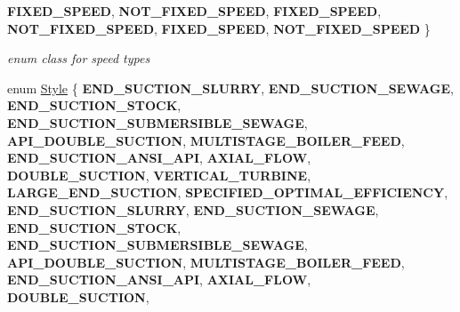 \begin{DoxyCompactItemize}
{\bfseries F\+I\+X\+E\+D\+\_\+\+S\+P\+E\+ED}, 
{\bfseries N\+O\+T\+\_\+\+F\+I\+X\+E\+D\+\_\+\+S\+P\+E\+ED}, 
{\bfseries F\+I\+X\+E\+D\+\_\+\+S\+P\+E\+ED}, 
{\bfseries N\+O\+T\+\_\+\+F\+I\+X\+E\+D\+\_\+\+S\+P\+E\+ED}, 
\newline
{\bfseries F\+I\+X\+E\+D\+\_\+\+S\+P\+E\+ED}, 
{\bfseries N\+O\+T\+\_\+\+F\+I\+X\+E\+D\+\_\+\+S\+P\+E\+ED}
 \}\begin{DoxyCompactList}\small\item\em enum class for speed types \end{DoxyCompactList}
\item 
\mbox{\label{class_pump_aef354601ce4218258cc898b35a1e90ff}} 
enum \hyperlink{class_pump_aef354601ce4218258cc898b35a1e90ff}{Style} \{ \newline
{\bfseries E\+N\+D\+\_\+\+S\+U\+C\+T\+I\+O\+N\+\_\+\+S\+L\+U\+R\+RY}, 
{\bfseries E\+N\+D\+\_\+\+S\+U\+C\+T\+I\+O\+N\+\_\+\+S\+E\+W\+A\+GE}, 
{\bfseries E\+N\+D\+\_\+\+S\+U\+C\+T\+I\+O\+N\+\_\+\+S\+T\+O\+CK}, 
{\bfseries E\+N\+D\+\_\+\+S\+U\+C\+T\+I\+O\+N\+\_\+\+S\+U\+B\+M\+E\+R\+S\+I\+B\+L\+E\+\_\+\+S\+E\+W\+A\+GE}, 
\newline
{\bfseries A\+P\+I\+\_\+\+D\+O\+U\+B\+L\+E\+\_\+\+S\+U\+C\+T\+I\+ON}, 
{\bfseries M\+U\+L\+T\+I\+S\+T\+A\+G\+E\+\_\+\+B\+O\+I\+L\+E\+R\+\_\+\+F\+E\+ED}, 
{\bfseries E\+N\+D\+\_\+\+S\+U\+C\+T\+I\+O\+N\+\_\+\+A\+N\+S\+I\+\_\+\+A\+PI}, 
{\bfseries A\+X\+I\+A\+L\+\_\+\+F\+L\+OW}, 
\newline
{\bfseries D\+O\+U\+B\+L\+E\+\_\+\+S\+U\+C\+T\+I\+ON}, 
{\bfseries V\+E\+R\+T\+I\+C\+A\+L\+\_\+\+T\+U\+R\+B\+I\+NE}, 
{\bfseries L\+A\+R\+G\+E\+\_\+\+E\+N\+D\+\_\+\+S\+U\+C\+T\+I\+ON}, 
{\bfseries S\+P\+E\+C\+I\+F\+I\+E\+D\+\_\+\+O\+P\+T\+I\+M\+A\+L\+\_\+\+E\+F\+F\+I\+C\+I\+E\+N\+CY}, 
\newline
{\bfseries E\+N\+D\+\_\+\+S\+U\+C\+T\+I\+O\+N\+\_\+\+S\+L\+U\+R\+RY}, 
{\bfseries E\+N\+D\+\_\+\+S\+U\+C\+T\+I\+O\+N\+\_\+\+S\+E\+W\+A\+GE}, 
{\bfseries E\+N\+D\+\_\+\+S\+U\+C\+T\+I\+O\+N\+\_\+\+S\+T\+O\+CK}, 
{\bfseries E\+N\+D\+\_\+\+S\+U\+C\+T\+I\+O\+N\+\_\+\+S\+U\+B\+M\+E\+R\+S\+I\+B\+L\+E\+\_\+\+S\+E\+W\+A\+GE}, 
\newline
{\bfseries A\+P\+I\+\_\+\+D\+O\+U\+B\+L\+E\+\_\+\+S\+U\+C\+T\+I\+ON}, 
{\bfseries M\+U\+L\+T\+I\+S\+T\+A\+G\+E\+\_\+\+B\+O\+I\+L\+E\+R\+\_\+\+F\+E\+ED}, 
{\bfseries E\+N\+D\+\_\+\+S\+U\+C\+T\+I\+O\+N\+\_\+\+A\+N\+S\+I\+\_\+\+A\+PI}, 
{\bfseries A\+X\+I\+A\+L\+\_\+\+F\+L\+OW}, 
\newline
{\bfseries D\+O\+U\+B\+L\+E\+\_\+\+S\+U\+C\+T\+I\+ON}, 

\end{DoxyCompactItemize}
